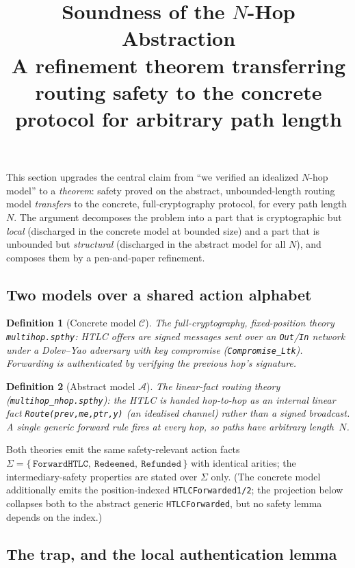 \documentclass[11pt]{article}
\title{\textbf{Soundness of the $N$-Hop Abstraction}\\\large A refinement theorem transferring routing safety to the concrete protocol for arbitrary path length}
\author{}\date{}
\newtheorem{definition}{Definition}
\begin{document}
\maketitle

\noindent
This section upgrades the central claim from ``we verified an idealized $N$-hop
model'' to a \emph{theorem}: safety proved on the abstract, unbounded-length
routing model \emph{transfers} to the concrete, full-cryptography protocol, for
every path length $N$. The argument decomposes the problem into a part that is
cryptographic but \emph{local} (discharged in the concrete model at bounded
size) and a part that is unbounded but \emph{structural} (discharged in the
abstract model for all $N$), and composes them by a pen-and-paper refinement.

\subsection*{Two models over a shared action alphabet}

\begin{definition}[Concrete model $\mathcal{C}$]
The full-cryptography, fixed-position theory \texttt{multihop.spthy}: HTLC
offers are signed messages sent over an \texttt{Out}/\texttt{In} network under a
Dolev--Yao adversary with key compromise (\texttt{Compromise\_Ltk}). Forwarding
is authenticated by verifying the previous hop's signature.
\end{definition}

\begin{definition}[Abstract model $\mathcal{A}$]
The linear-fact routing theory (\texttt{multihop\_nhop.spthy}): the HTLC is
handed hop-to-hop as an internal linear fact \texttt{Route(prev,me,ptr,y)}
(an \emph{idealised channel}) rather than a signed broadcast. A single generic
forward rule fires at every hop, so paths have arbitrary length~$N$.
\end{definition}

Both theories emit the same safety-relevant action facts
$\Sigma = \{\,\texttt{ForwardHTLC},\ \texttt{Redeemed},\ \texttt{Refunded}\,\}$
with identical arities; the intermediary-safety properties are stated over
$\Sigma$ only. (The concrete model additionally emits the position-indexed
\texttt{HTLCForwarded1/2}; the projection below collapses both to the abstract
generic \texttt{HTLCForwarded}, but no safety lemma depends on the index.)

\subsection*{The trap, and the local authentication lemma}
\end{document}
